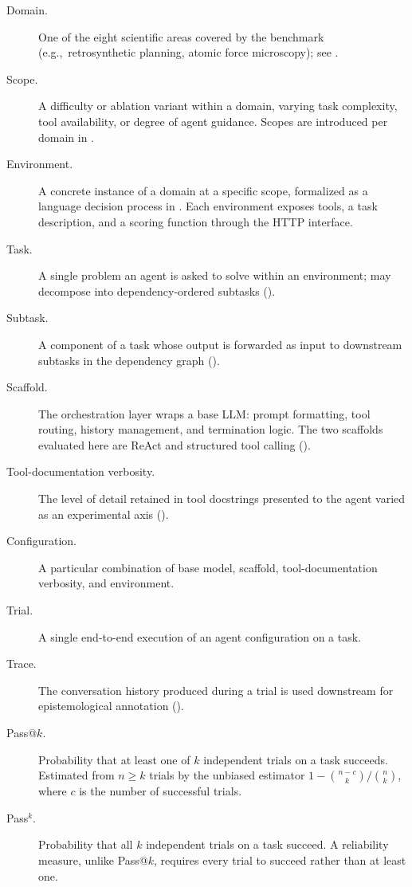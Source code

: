 \begin{description}
    \item[Domain.] One of the eight scientific areas covered by the benchmark (e.g.,\ retrosynthetic planning, atomic force microscopy); see .
    \item[Scope.] A difficulty or ablation variant within a domain, varying task complexity, tool availability, or degree of agent guidance. Scopes are introduced per domain in .
    \item[Environment.] A concrete instance of a domain at a specific scope, formalized as a language decision process in . Each environment exposes tools, a task description, and a scoring function through the \corral HTTP interface.
    \item[Task.] A single problem an agent is asked to solve within an environment; may decompose into dependency-ordered subtasks ().
    \item[Subtask.] A component of a task whose output is forwarded as input to downstream subtasks in the dependency graph ().
    \item[Scaffold.] The orchestration layer wraps a base LLM: prompt formatting, tool routing, history management, and termination logic. The two scaffolds evaluated here are ReAct and structured tool calling ().
    \item[Tool-documentation verbosity.] The level of detail retained in tool docstrings presented to the agent varied as an experimental axis ().
    \item[Configuration.] A particular combination of base model, scaffold, tool-documentation verbosity, and environment.
    \item[Trial.] A single end-to-end execution of an agent configuration on a task.
    \item[Trace.] The conversation history produced during a trial is used downstream for epistemological annotation ().
    \item[Pass@$k$.] Probability that at least one of $k$ independent trials on a task succeeds. Estimated from $n \ge k$ trials by the unbiased estimator $1 - \binom{n-c}{k} / \binom{n}{k}$, where $c$ is the number of successful trials.
    \item[Pass$^k$.] Probability that all $k$ independent trials on a task succeed. A reliability measure, unlike Pass@$k$, requires every trial to succeed rather than at least one.

\end{description}
